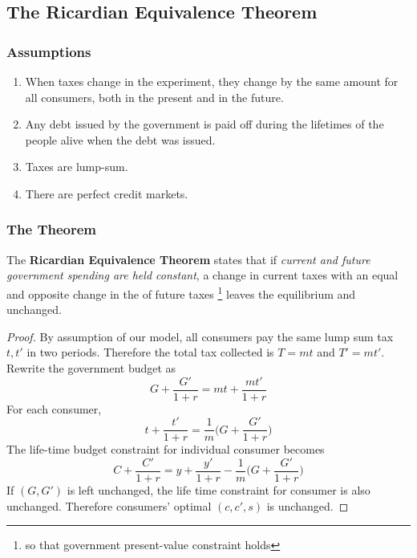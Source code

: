 \documentclass[11pt]{article}
\begin{document}
		\subsection{The Ricardian Equivalence Theorem}
		\subsubsection{Assumptions}
		
		\begin{assumption}
			\begin{enumerate}
				\item When taxes change in the experiment, they change by the same amount for all consumers, both in the present and in the future.
				\item Any debt issued by the government is paid off during the lifetimes of the people alive when the debt was issued.
				\item Taxes are lump-sum.
				\item There are perfect credit markets.
			\end{enumerate}
		\end{assumption}
		
		
		\subsubsection{The Theorem}
		\begin{definition}
			The \textbf{Ricardian Equivalence Theorem} states that if \emph{current and future government spending are held constant}, a change in current taxes with an equal and opposite change in the  of future taxes \footnote{so that government present-value constraint holds} leaves the equilibrium  and  unchanged.
		\end{definition}
		
		\begin{proof}
			By assumption of our model, all consumers pay the same lump sum tax $t, t'$ in two periods. Therefore the total tax collected is $T=mt$ and $T'=mt'$. Rewrite the government budget as
			\[
				G + \frac{G'}{1+r} = mt + \frac{mt'}{1+r}
			\]
			For each consumer,
			\[
				t + \frac{t'}{1+r} = \frac{1}{m} \big( G + \frac{G'}{1+r} \big )
			\]
			The life-time budget constraint for individual consumer becomes
			\[
				C + \frac{C'}{1+r} = y + \frac{y'}{1+r} - \frac{1}{m} \big( G + \frac{G'}{1+r} \big )
			\]
			If $(G, G')$ is left unchanged, the life time constraint for consumer is also unchanged. Therefore consumers' optimal $(c,c',s)$ is unchanged.
		\end{proof}
		
\end{document}
